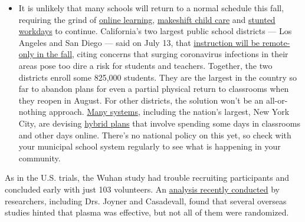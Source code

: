 \begin{itemize}
  \begin{itemize}
  \tightlist
  \item
    It is unlikely that many schools will return to a normal schedule
    this fall, requiring the grind of
    \href{https://www.nytimes3xbfgragh.onion/2020/06/05/us/coronavirus-education-lost-learning.html?action=click\&pgtype=Article\&state=default\&region=MAIN_CONTENT_3\&context=storylines_faq}{online
    learning},
    \href{https://www.nytimes3xbfgragh.onion/2020/05/29/us/coronavirus-child-care-centers.html?action=click\&pgtype=Article\&state=default\&region=MAIN_CONTENT_3\&context=storylines_faq}{makeshift
    child care} and
    \href{https://www.nytimes3xbfgragh.onion/2020/06/03/business/economy/coronavirus-working-women.html?action=click\&pgtype=Article\&state=default\&region=MAIN_CONTENT_3\&context=storylines_faq}{stunted
    workdays} to continue. California's two largest public school
    districts --- Los Angeles and San Diego --- said on July 13, that
    \href{https://www.nytimes3xbfgragh.onion/2020/07/13/us/lausd-san-diego-school-reopening.html?action=click\&pgtype=Article\&state=default\&region=MAIN_CONTENT_3\&context=storylines_faq}{instruction
    will be remote-only in the fall}, citing concerns that surging
    coronavirus infections in their areas pose too dire a risk for
    students and teachers. Together, the two districts enroll some
    825,000 students. They are the largest in the country so far to
    abandon plans for even a partial physical return to classrooms when
    they reopen in August. For other districts, the solution won't be an
    all-or-nothing approach.
    \href{https://bioethics.jhu.edu/research-and-outreach/projects/eschool-initiative/school-policy-tracker/}{Many
    systems}, including the nation's largest, New York City, are
    devising
    \href{https://www.nytimes3xbfgragh.onion/2020/06/26/us/coronavirus-schools-reopen-fall.html?action=click\&pgtype=Article\&state=default\&region=MAIN_CONTENT_3\&context=storylines_faq}{hybrid
    plans} that involve spending some days in classrooms and other days
    online. There's no national policy on this yet, so check with your
    municipal school system regularly to see what is happening in your
    community.
  \end{itemize}
\end{itemize}

As in the U.S. trials, the Wuhan study had trouble recruiting
participants and concluded early with just 103 volunteers. An
\href{https://www.medrxiv.org/content/10.1101/2020.07.29.20162917v1.full.pdf}{analysis
recently conducted} by researchers, including Drs. Joyner and
Casadevall, found that several overseas studies hinted that plasma was
effective, but not all of them were randomized.

